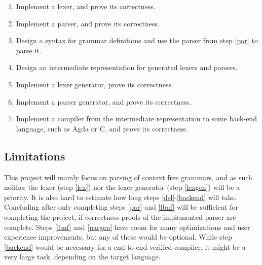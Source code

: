 \documentclass{article}
\begin{document}
	\begin{enumerate}

		\item \label{lex}

			Implement a lexer, and prove its correctness.

		\item \label{par}

			Implement a parser, and prove its correctness.

		\item \label{lbnf}

			Design a syntax for grammar definitions and use the parser from
			step \ref{par} to parse it.

		\item \label{dsl}

			Design an intermediate representation for generated lexers and
			parsers.

		\item \label{lexgen}

			Implement a lexer generator, prove its correctness.

		\item \label{pargen}

			Implement a parser generator, and prove  its correctness.

		\item \label{backend}

			Implement a compiler from the intermediate representation to some
			back-end language, such as Agda or C, and prove its correctness.

	\end{enumerate}

	\subsection{Limitations}


		This project will mainly focus on parsing of context free grammars, and
		as such neither the lexer (step \ref{lex}) nor the lexer generator
		(step \ref{lexgen}) will be a priority. It is also hard to estimate how
		long steps \ref{dsl}-\ref{backend} will take. Concluding after only
		completing steps \ref{par} and \ref{lbnf} will be sufficient for
		completing the project, if correctness proofs of the implemented parser
		are complete.  Steps \ref{lbnf} and \ref{pargen} have room for many
		optimizations and user experience improvements, but any of these would
		be optional. While step \ref{backend} would be necessary for a
		end-to-end verified compiler, it might be a very large task, depending
		on the target language.
\end{document}
